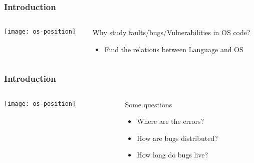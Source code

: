 \begin{frame}[plain]
	\frametitle{Introduction}
	
	
	
	\begin{columns}
		
		\begin{column}{.3\textwidth}
			
			\texttt{[image: os-position]}
			
		\end{column}
		
		\begin{column}{.7\textwidth}
			
			\Large
			Why study faults/bugs/Vulnerabilities in OS code?
			
			\begin{itemize}
				\item Find the relations between Language and OS
				
				
			\end{itemize}
			
		\end{column}
		
		
	\end{columns}
	
	
\end{frame}

\begin{frame}[plain]
	\frametitle{Introduction}
	
	
	
	\begin{columns}
		
		\begin{column}{.3\textwidth}
			
			\texttt{[image: os-position]}
			
		\end{column}
		
		\begin{column}{.7\textwidth}
			
			\Large
			Some questions
			\begin{itemize}
				\item  Where are the errors?
				
				\item How are bugs distributed?
				
				\item How long do bugs live?
							
			\end{itemize}
			
		\end{column}
		
		
	\end{columns}
	
	
\end{frame}


